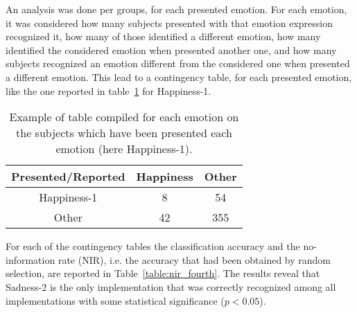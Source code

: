 An analysis was done per groups, for each presented emotion. For each emotion, it was considered how many subjects presented with that emotion expression recognized it, how many of those identified a different emotion, how many identified the considered emotion when presented another one, and how many subjects recognized an emotion different from the considered one when presented a different emotion. This lead to a contingency table, for each presented emotion, like the one reported in table~\ref{table:singleEmotion} for Happiness-1. 
\begin{table}[!htbp]
\begin{center}
\caption{Example of table compiled for each emotion on the subjects which have been presented each emotion (here Happiness-1).}
\label{table:singleEmotion}
\begin{tabular}{|c|c|c|}
\hline 
Presented/Reported&Happiness&Other\\
\hline 
Happiness-1&8&54\\
\hline 
Other&42&355\\
\hline
\end{tabular}
\end{center}
\end{table}

For each of the contingency tables the classification accuracy and the no-information rate (NIR), i.e. the accuracy that had been obtained by random selection, are reported in Table~\ref{table:nir_fourth}. The results reveal that Sadness-2 is the only implementation that was correctly recognized among all implementations with some statistical significance ($p<0.05$). 

